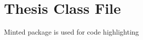 \chapter{Thesis Class File}

Minted package is used for code highlighting

\inputminted[fontsize=\scriptsize,linenos]{tex}{thesis.cls}

